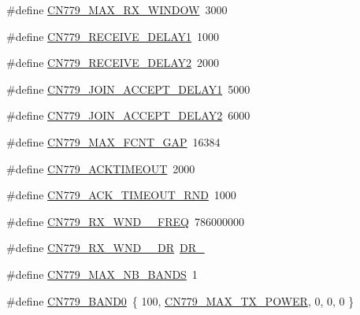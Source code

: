 \begin{DoxyCompactItemize}
\#define \mbox{\hyperlink{group___r_e_g_i_o_n_c_n779_ga3d2b8590a2e727046db467d647c96518}{C\+N779\+\_\+\+M\+A\+X\+\_\+\+R\+X\+\_\+\+W\+I\+N\+D\+OW}}~3000
\item 
\#define \mbox{\hyperlink{group___r_e_g_i_o_n_c_n779_gadd96388a9097e2d47d77a459b13c1309}{C\+N779\+\_\+\+R\+E\+C\+E\+I\+V\+E\+\_\+\+D\+E\+L\+A\+Y1}}~1000
\item 
\#define \mbox{\hyperlink{group___r_e_g_i_o_n_c_n779_ga40b53070cc108b1704c23fd196bc1a02}{C\+N779\+\_\+\+R\+E\+C\+E\+I\+V\+E\+\_\+\+D\+E\+L\+A\+Y2}}~2000
\item 
\#define \mbox{\hyperlink{group___r_e_g_i_o_n_c_n779_gae35de851225832e6fce8edbd9cc87e35}{C\+N779\+\_\+\+J\+O\+I\+N\+\_\+\+A\+C\+C\+E\+P\+T\+\_\+\+D\+E\+L\+A\+Y1}}~5000
\item 
\#define \mbox{\hyperlink{group___r_e_g_i_o_n_c_n779_gaba22c62202d5f40c7c952706604f961b}{C\+N779\+\_\+\+J\+O\+I\+N\+\_\+\+A\+C\+C\+E\+P\+T\+\_\+\+D\+E\+L\+A\+Y2}}~6000
\item 
\#define \mbox{\hyperlink{group___r_e_g_i_o_n_c_n779_ga6bac9924ad75dba200876f5ddcb8d91e}{C\+N779\+\_\+\+M\+A\+X\+\_\+\+F\+C\+N\+T\+\_\+\+G\+AP}}~16384
\item 
\#define \mbox{\hyperlink{group___r_e_g_i_o_n_c_n779_gaf4edb86dfa6b0c55d43f183399b36878}{C\+N779\+\_\+\+A\+C\+K\+T\+I\+M\+E\+O\+UT}}~2000
\item 
\#define \mbox{\hyperlink{group___r_e_g_i_o_n_c_n779_gaead3d649c05b0529d19d2fd1994f1d93}{C\+N779\+\_\+\+A\+C\+K\+\_\+\+T\+I\+M\+E\+O\+U\+T\+\_\+\+R\+ND}}~1000
\item 
\#define \mbox{\hyperlink{group___r_e_g_i_o_n_c_n779_ga055b0718f7cc4056fc467f5abe971d8c}{C\+N779\+\_\+\+R\+X\+\_\+\+W\+N\+D\+\_\+\_\+\+F\+R\+EQ}}~786000000
\item 
\#define \mbox{\hyperlink{group___r_e_g_i_o_n_c_n779_gac242b7599d5234bc866206a447d8c517}{C\+N779\+\_\+\+R\+X\+\_\+\+W\+N\+D\+\_\+\_\+\+DR}}~\mbox{\hyperlink{group___r_e_g_i_o_n_ga6c4ef966b4f3d5eb7597b087f2b97095}{D\+R\+\_}}
\item 
\#define \mbox{\hyperlink{group___r_e_g_i_o_n_c_n779_ga605a78b9ce2c56ef5d320e029e369236}{C\+N779\+\_\+\+M\+A\+X\+\_\+\+N\+B\+\_\+\+B\+A\+N\+DS}}~1
\item 
\#define \mbox{\hyperlink{group___r_e_g_i_o_n_c_n779_ga428819be1d6f97028be344a4bf8dff3e}{C\+N779\+\_\+\+B\+A\+N\+D0}}~\{ 100, \mbox{\hyperlink{group___r_e_g_i_o_n_c_n779_ga8a70356561f3416db21a1e93b4ee4ae9}{C\+N779\+\_\+\+M\+A\+X\+\_\+\+T\+X\+\_\+\+P\+O\+W\+ER}}, 0, 0, 0 \}
\item 

\end{DoxyCompactItemize}

